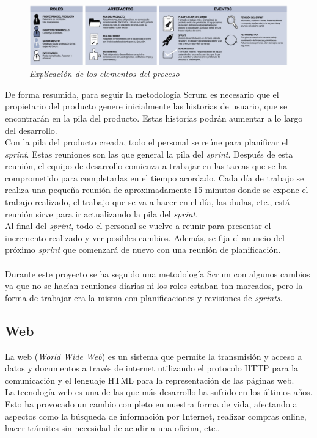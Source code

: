 \begin{figure}
	\centering
	\includegraphics[width=\textwidth]{../img/Scrum/Scrum1.png}
	\caption{\textit{Explicación de los elementos del proceso \cite{scrum}}}\label{ProcesoScrum2}
\end{figure}


De forma resumida, para seguir la metodología Scrum es necesario que el propietario del producto genere inicialmente las historias de usuario, que se encontrarán en la pila del producto. Estas historias podrán aumentar a lo largo del desarrollo.\\
Con la pila del producto creada, todo el personal se reúne para planificar el \textit{sprint}. Estas reuniones son las que general la pila del \textit{sprint}.
Después de esta reunión, el equipo de desarrollo comienza a trabajar en las tareas que se ha comprometido para completarlas en el tiempo acordado. Cada día de trabajo se realiza una pequeña reunión de aproximadamente 15 minutos donde se expone el trabajo realizado, el trabajo que se va a hacer en el día, las dudas, etc., está reunión sirve para ir actualizando la pila del \textit{sprint}. \\
Al final del \textit{sprint}, todo el personal se vuelve a reunir para presentar el incremento realizado y ver posibles cambios. Además, se fija el anuncio del próximo \textit{sprint} que comenzará de nuevo con una reunión de planificación. \\\\
Durante este proyecto se ha seguido una metodología Scrum con algunos cambios ya que no se hacían reuniones diarias ni los roles estaban tan marcados, pero la forma de trabajar era la misma con planificaciones y revisiones de \textit{sprints}.

\subsection{Web}
La web (\textit{World Wide Web}) es un sistema que permite la transmisión y acceso a datos y documentos a través de internet utilizando el protocolo HTTP para la comunicación y el lenguaje HTML para la representación de las páginas web. \cite{wiki:web}\\
La tecnología web es una de las que más desarrollo ha sufrido en los últimos años. Esto ha provocado un cambio completo en nuestra forma de vida, afectando a aspectos como la búsqueda de información por Internet, realizar compras online, hacer trámites sin necesidad de acudir a una oficina, etc.,\\ 
 
